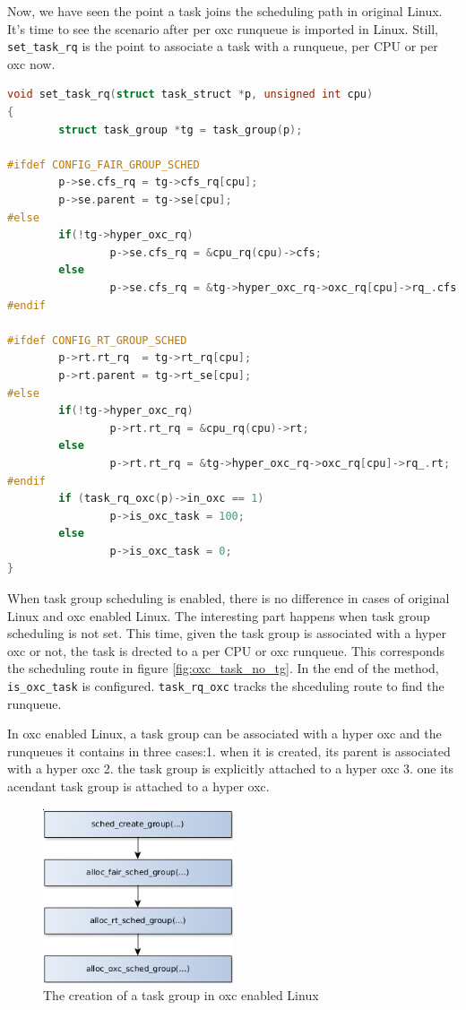 Now, we have seen the point a task joins the scheduling path in original Linux.
It's time to see the scenario after per oxc runqueue is imported in Linux.
Still, \texttt{set\_task\_rq} is the point to associate a task with a 
runqueue, per CPU or per oxc now.
\begin{lstlisting}[language=C, 
        caption={To associate a task with a runqueue under oxc framework}]
void set_task_rq(struct task_struct *p, unsigned int cpu)
{
        struct task_group *tg = task_group(p);

#ifdef CONFIG_FAIR_GROUP_SCHED
        p->se.cfs_rq = tg->cfs_rq[cpu];
        p->se.parent = tg->se[cpu];
#else
        if(!tg->hyper_oxc_rq)
                p->se.cfs_rq = &cpu_rq(cpu)->cfs;
        else
                p->se.cfs_rq = &tg->hyper_oxc_rq->oxc_rq[cpu]->rq_.cfs;
#endif

#ifdef CONFIG_RT_GROUP_SCHED
        p->rt.rt_rq  = tg->rt_rq[cpu];
        p->rt.parent = tg->rt_se[cpu];
#else
        if(!tg->hyper_oxc_rq)
                p->rt.rt_rq = &cpu_rq(cpu)->rt;
        else
                p->rt.rt_rq = &tg->hyper_oxc_rq->oxc_rq[cpu]->rq_.rt;
#endif
        if (task_rq_oxc(p)->in_oxc == 1)
                p->is_oxc_task = 100;
        else
                p->is_oxc_task = 0;
}
\end{lstlisting}
                                                  
When task group scheduling is enabled, there is no difference in cases of 
original Linux and oxc enabled Linux. The interesting part happens when 
task group scheduling is not set. This time, given the task group is associated
with a hyper oxc or not, the task is drected to a per CPU or oxc runqueue. This 
corresponds the scheduling route in figure \ref{fig:oxc_task_no_tg}. In 
the end of the method, \texttt{is\_oxc\_task} is configured. 
\texttt{task\_rq\_oxc} tracks the shceduling route to find the runqueue.

In oxc enabled Linux, a task group can be associated with a hyper oxc and
the runqueues it contains in three cases:1. when it is created, its parent is 
associated with a hyper oxc 2. the task group is explicitly attached to
a hyper oxc 3. one its acendant task group is attached to a hyper oxc.
\begin{figure}[htbp]
        \centering
        \includegraphics[height=0.25\textheight,width=0.5\textwidth]{images/tg_creation_oxc}
        \caption{The creation of a task group in oxc enabled Linux}
        \label{fig:tg_creation_oxc}
\end{figure}


